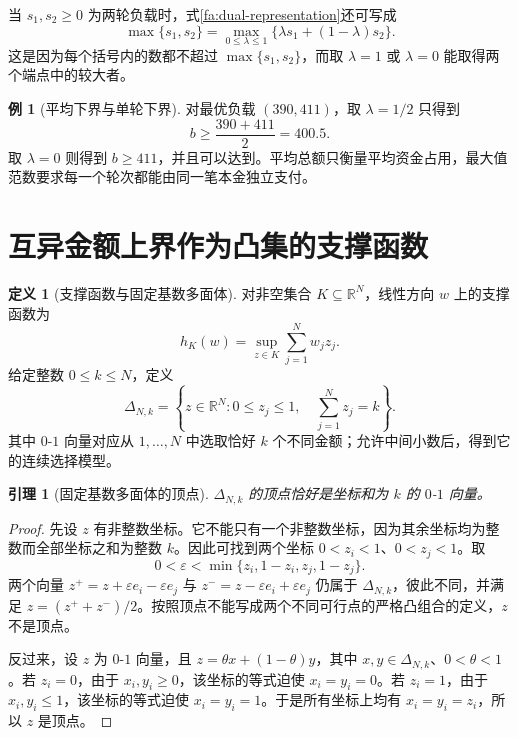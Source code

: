 \documentclass[UTF8,a4paper]{ctexbook}
\newtheorem{lemma}[theorem]{引理}
\theoremstyle{definition}
\newtheorem{definition}[theorem]{定义}
\newtheorem{example}[theorem]{例}
\numberwithin{equation}{chapter}
\newcommand{\1}{\mathbf{1}}
\begin{document}
当 $s_1,s_2\ge0$ 为两轮负载时，式\eqref{fa:dual-representation}还可写成
\begin{equation}\label{fa:positive-dual}
\max\{s_1,s_2\}
=\max_{0\le\lambda\le1}\{\lambda s_1+(1-\lambda)s_2\}.
\end{equation}
这是因为每个括号内的数都不超过 $\max\{s_1,s_2\}$，而取 $\lambda=1$ 或 $\lambda=0$ 能取得两个端点中的较大者。

\begin{example}[平均下界与单轮下界]\label{fa:dual-example}
对最优负载 $(390,411)$，取 $\lambda=1/2$ 只得到
\[
b\ge\frac{390+411}{2}=400.5.
\]
取 $\lambda=0$ 则得到 $b\ge411$，并且可以达到。平均总额只衡量平均资金占用，最大值范数要求每一个轮次都能由同一笔本金独立支付。
\end{example}

\section{互异金额上界作为凸集的支撑函数}

\begin{definition}[支撑函数与固定基数多面体]\label{fa:support-def}
对非空集合 $K\subseteq\mathbb R^N$，线性方向 $w$ 上的支撑函数为
\[
h_K(w)=\sup_{z\in K}\sum_{j=1}^N w_jz_j.
\]
给定整数 $0\le k\le N$，定义
\[
\Delta_{N,k}
=\left\{z\in\mathbb R^N:
0\le z_j\le1,\quad\sum_{j=1}^N z_j=k\right\}.
\]
其中 $0$-$1$ 向量对应从 $1,\ldots,N$ 中选取恰好 $k$ 个不同金额；允许中间小数后，得到它的连续选择模型。
\end{definition}

\begin{lemma}[固定基数多面体的顶点]\label{fa:hypersimplex}
$\Delta_{N,k}$ 的顶点恰好是坐标和为 $k$ 的 $0$-$1$ 向量。
\end{lemma}

\begin{proof}
先设 $z$ 有非整数坐标。它不能只有一个非整数坐标，因为其余坐标均为整数而全部坐标之和为整数 $k$。因此可找到两个坐标 $0<z_i<1$、$0<z_j<1$。取
\[
0<\varepsilon<\min\{z_i,1-z_i,z_j,1-z_j\}.
\]
两个向量 $z^+=z+\varepsilon e_i-\varepsilon e_j$ 与 $z^-=z-\varepsilon e_i+\varepsilon e_j$ 仍属于 $\Delta_{N,k}$，彼此不同，并满足 $z=(z^++z^-)/2$。按照顶点不能写成两个不同可行点的严格凸组合的定义，$z$ 不是顶点。

反过来，设 $z$ 为 $0$-$1$ 向量，且 $z=\theta x+(1-\theta)y$，其中 $x,y\in\Delta_{N,k}$、$0<\theta<1$。若 $z_i=0$，由于 $x_i,y_i\ge0$，该坐标的等式迫使 $x_i=y_i=0$。若 $z_i=1$，由于 $x_i,y_i\le1$，该坐标的等式迫使 $x_i=y_i=1$。于是所有坐标上均有 $x_i=y_i=z_i$，所以 $z$ 是顶点。
\end{proof}
\end{document}
